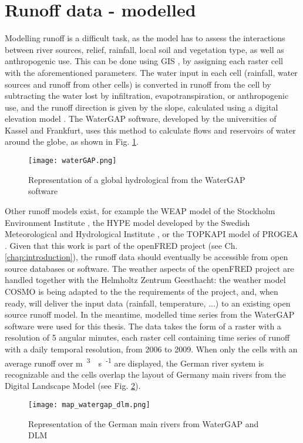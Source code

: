 \section{Runoff data - modelled}

\label{sec:mod_runoff}
Modelling runoff is a difficult task, as the model has to assess the interactions between river sources, relief, rainfall, local soil and vegetation type, as well as anthropogenic use. This can be done using GIS \cite{bayazit}, by assigning each raster cell with the aforementioned parameters. The water input in each cell (rainfall, water sources and runoff from other cells) is converted in runoff from the cell by subtracting the water lost by infiltration, evapotranspiration, or anthropogenic use, and the runoff direction is given by the slope, calculated using a digital elevation model \cite{heywood}. \newline
The WaterGAP software, developed by the universities of Kassel and Frankfurt, uses this method to calculate flows and reservoirs of water around the globe, as shown in Fig. \ref{waterGAP}.
\begin{figure}[H]
\centering
\texttt{[image: waterGAP.png]}
\caption[Representation of a global hydrological from the WaterGAP software]{Representation of a global hydrological from the WaterGAP software \cite{doll}}
\label{waterGAP}
\end{figure}
Other runoff models exist, for example the WEAP model of the Stockholm Environment Institute \cite{weap}, the HYPE model developed by the Swedish Meteorological and Hydrological Institute \cite{hype}, or the TOPKAPI model of PROGEA \cite{topkapi}. \newline
Given that this work is part of the openFRED project (see Ch. \ref{chap:introduction}), the runoff data should eventually be accessible from open source databases or software. The weather aspects of the openFRED project are handled together with the Helmholtz Zentrum Geesthacht: the weather model COSMO is being adapted to the the requirements of the project, and, when ready, will deliver the input data (rainfall, temperature, ...) to an existing open source runoff model. \newline
In the meantime, modelled time series from the WaterGAP software were used for this thesis. The data takes the form of a raster with a resolution of 5 angular minutes, each raster cell containing time series of runoff with a daily temporal resolution, from 2006 to 2009. When only the cells with an average runoff over \unit[100]{m\textsuperscript{3}\textperiodcentered s\textsuperscript{-1}} are displayed, the German river system is recognizable and the cells overlap the layout of Germany main rivers from the Digital Landscape Model \cite{dlm250} (see Fig. \ref{map_watergap_dlm}).

\begin{figure}[H]
\centering
\texttt{[image: map\_watergap\_dlm.png]}
\caption[Representation of the German main rivers from WaterGAP and DLM]{Representation of the German main rivers from WaterGAP and DLM}
\label{map_watergap_dlm}
\end{figure}
